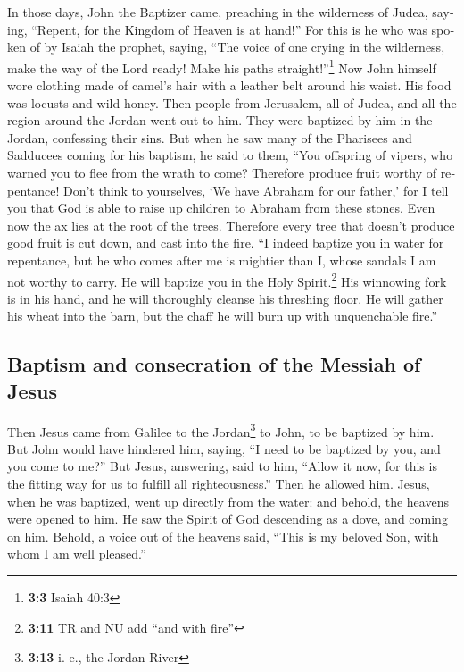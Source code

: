 \begin{paracol}{2}
\begin{otherlanguage}{english}
 In those days, John the Baptizer came, preaching in the
wilderness of Judea, saying,  ``Repent, for the Kingdom of
Heaven is at hand!''  For this is he who was spoken of by
Isaiah the prophet, saying, ``The voice of one crying in the wilderness,
make the way of the Lord ready! Make his paths straight!''\footnote{\textbf{3:3}
  Isaiah 40:3}  Now John himself wore clothing made of
camel's hair with a leather belt around his waist. His food was locusts
and wild honey.  Then people from Jerusalem, all of Judea,
and all the region around the Jordan went out to him. 
They were baptized by him in the Jordan, confessing their sins.
 But when he saw many of the Pharisees and Sadducees
coming for his baptism, he said to them, ``You offspring of vipers, who
warned you to flee from the wrath to come?  Therefore
produce fruit worthy of repentance!  Don't think to
yourselves, `We have Abraham for our father,' for I tell you that God is
able to raise up children to Abraham from these stones. 
Even now the ax lies at the root of the trees. Therefore every tree that
doesn't produce good fruit is cut down, and cast into the fire.
 ``I indeed baptize you in water for repentance, but he
who comes after me is mightier than I, whose sandals I am not worthy to
carry. He will baptize you in the Holy Spirit.\footnote{\textbf{3:11} TR
  and NU add ``and with fire''}  His winnowing fork is in
his hand, and he will thoroughly cleanse his threshing floor. He will
gather his wheat into the barn, but the chaff he will burn up with
unquenchable fire.''

\hypertarget{baptism-and-consecration-of-the-messiah-of-jesus}{%
\subsection{Baptism and consecration of the Messiah of
Jesus}\label{baptism-and-consecration-of-the-messiah-of-jesus}}

 Then Jesus came from Galilee to the Jordan\footnote{\textbf{3:13}
  i. e., the Jordan River} to John, to be baptized by him.
 But John would have hindered him, saying, ``I need to be
baptized by you, and you come to me?''  But Jesus,
answering, said to him, ``Allow it now, for this is the fitting way for
us to fulfill all righteousness.'' Then he allowed him. 
Jesus, when he was baptized, went up directly from the water: and
behold, the heavens were opened to him. He saw the Spirit of God
descending as a dove, and coming on him.  Behold, a voice
out of the heavens said, ``This is my beloved Son, with whom I am well
pleased.''


\end{otherlanguage}
\end{paracol}
